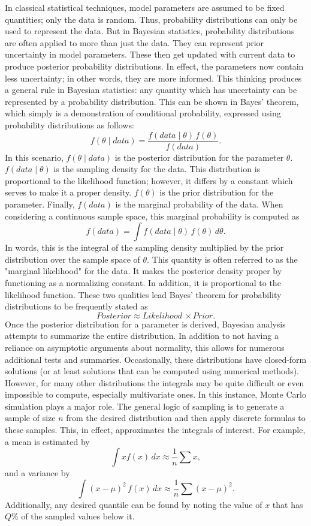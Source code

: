 \documentclass[11pt, oneside]{article}
\begin{document}
In classical statistical techniques, model parameters are assumed to be fixed quantities; only the data is random. Thus, probability distributions can only be used to represent the data. But in Bayesian statistics, probability distributions are often applied to more than just the data. They can represent prior uncertainty in model parameters. These then get updated with current data to produce posterior probability distributions. In effect, the parameters now contain less uncertainty; in other words, they are more informed. This thinking produces a general rule in Bayesian statistics: any quantity which has uncertainty can be represented by a probability distribution. This can be shown in Bayes' theorem, which simply is a demonstration of conditional probability, expressed using probability distributions as follows:
\[
f(\theta\mid data)=\frac{f(data\mid\theta)\,f(\theta)}{f(data)}.
\]
In this scenario, $f(\theta\mid data)$ is the posterior distribution for the parameter $\theta$. $f(data\mid\theta)$  is the sampling density for the data. This distribution is proportional to the likelihood function; however, it differs by a constant which serves to make it a proper density. $f(\theta)$ is the prior distribution for the parameter. Finally, $f(data)$ is the marginal probability of the data. When considering a continuous sample space, this marginal probability is computed as
\[
f(data)=\int{f(data\mid\theta)\,f(\theta)\,d\theta}.
\]
In words, this is the integral of the sampling density multiplied by the prior distribution over the sample space of $\theta$. This quantity is often referred to as the "marginal likelihood" for the data. It makes the posterior density proper by functioning as a normalizing constant. In addition, it is proportional to the likelihood function. These two qualities lead Bayes' theorem for probability distributions to be frequently stated as
\[
Posterior\approx Likelihood\,\times Prior.
\]
Once the posterior distribution for a parameter is derived, Bayesian analysis attempts to summarize the entire distribution. In addition to not having a reliance on asymptotic arguments about normality, this allows for numerous additional tests and summaries. Occasionally, these distributions have closed-form solutions (or at least solutions that can be computed using numerical methods). However, for many other distributions the integrals may be quite difficult or even impossible to compute, especially multivariate ones. In this instance, Monte Carlo simulation plays a major role. The general logic of sampling is to generate a sample of size $n$ from the desired distribution and then apply discrete formulas to these samples. This, in effect, approximates the integrals of interest. For example, a mean is estimated by
\[
\int xf(x)\,dx\approx\frac{1}{n}\sum x,
\]
and a variance by
\[
\int (x-\mu)^2\,f(x)\,dx\approx\frac{1}{n}\sum (x-\mu)^2.
\]
Additionally, any desired quantile can be found by noting the value of $x$ that has $Q\%$ of the sampled values below it.
\end{document}
